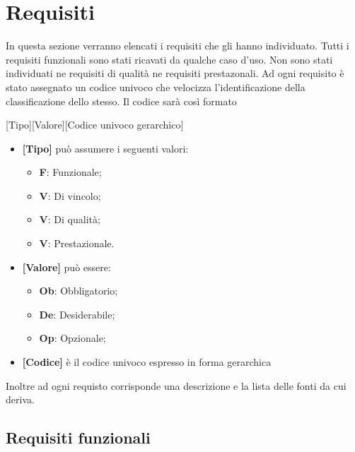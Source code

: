 \section{Requisiti}
In questa sezione verranno elencati i requisiti che gli  hanno individuato. 
Tutti i requisiti funzionali sono stati ricavati da qualche caso d'uso.
Non sono stati individuati ne requisiti di qualità ne requisiti prestazonali.
Ad ogni requisito è stato assegnato un codice univoco che velocizza l'identificazione della classificazione dello stesso.
Il codice sarà così formato
\begin{center}
[Tipo][Valore][Codice univoco gerarchico]
\end{center}
\begin{itemize}
\item \textbf{[Tipo]} può assumere i seguenti valori:
\begin{itemize}
	\item \textbf{F}: Funzionale;
	\item \textbf{V}: Di vincolo;
	\item \textbf{V}: Di qualità;
	\item \textbf{V}: Prestazionale.
\end{itemize}
\item \textbf{[Valore]} può essere:
\begin{itemize}
	\item \textbf{Ob}: Obbligatorio;
	\item \textbf{De}: Desiderabile;
	\item \textbf{Op}: Opzionale;
\end{itemize}
\item \textbf{[Codice]} è il codice univoco espresso in forma gerarchica
\end{itemize}
Inoltre ad ogni requisto corrisponde una descrizione e la lista delle fonti da cui deriva.
\subsection{ Requisiti funzionali}
	
